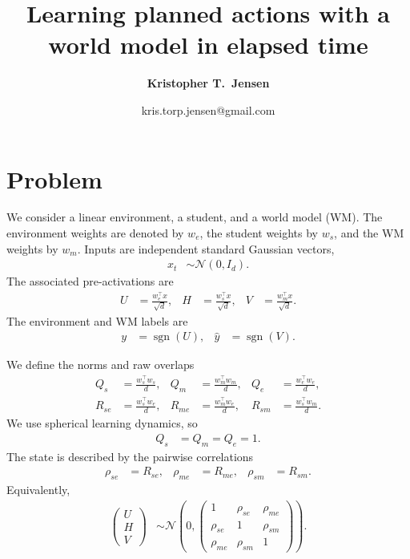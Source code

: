 \documentclass{article}
\title{\Large{Learning planned actions with a world model in elapsed time}}
\author[1]{\normalsize \bfseries Kristopher T.\ Jensen}
\affil[1]{\small Sainsbury Wellcome Centre, University College London, London, UK}
\date{\vspace*{-2.0em}
\normalsize kris.torp.jensen@gmail.com
}
\newcommand*\sgn[1]{\operatorname{sgn}\!\left({#1}\right)}
\begin{document}
\maketitle

\section{Problem}

We consider a linear environment, a student, and a world model (WM). The environment weights are denoted by $w_e$, the student weights by $w_s$, and the WM weights by $w_m$. Inputs are independent standard Gaussian vectors,
\begin{align}
x_t &\sim \mathcal N(0,I_d).
\end{align}
The associated pre-activations are
\begin{align}
U &= \frac{w_e^\top x}{\sqrt d}, & H &= \frac{w_s^\top x}{\sqrt d}, & V &= \frac{w_m^\top x}{\sqrt d}.
\end{align}
The environment and WM labels are
\begin{align}
y &= \sgn{U}, & \hat y &= \sgn{V}.
\end{align}

We define the norms and raw overlaps
\begin{align}
Q_s &= \frac{w_s^\top w_s}{d}, & Q_m &= \frac{w_m^\top w_m}{d}, & Q_e &= \frac{w_e^\top w_e}{d}, \\
R_{se} &= \frac{w_s^\top w_e}{d}, & R_{me} &= \frac{w_m^\top w_e}{d}, & R_{sm} &= \frac{w_s^\top w_m}{d}.
\end{align}
We use spherical learning dynamics, so
\begin{align}
Q_s &= Q_m = Q_e = 1.
\end{align}
The state is described by the pairwise correlations
\begin{align}
\rho_{se} &= R_{se}, & \rho_{me} &= R_{me}, & \rho_{sm} &= R_{sm}.
\end{align}
Equivalently,
\begin{align}
\begin{pmatrix}U \\
H \\
V\end{pmatrix} &\sim \mathcal N\left(0,\begin{pmatrix}1 & \rho_{se} & \rho_{me} \\
\rho_{se} & 1 & \rho_{sm} \\
\rho_{me} & \rho_{sm} & 1\end{pmatrix}\right).
\end{align}
\end{document}
